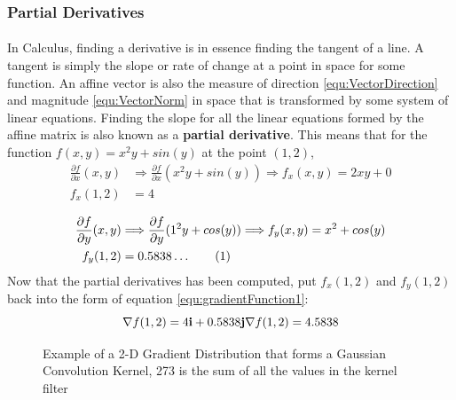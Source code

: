 \documentclass[11pt]{article}
\newcommand\numberthis{\addtocounter{equation}{1}\tag{\theequation}}%
\newcommand\simpleparagraph[1]{%
	\stepcounter{paragraph}\paragraph*{\theparagraph\quad{}#1}}
\renewcommand\theparagraph{}
\begin{document}
\subsubsection{Partial Derivatives}
\simpleparagraph{}
In Calculus, finding a derivative is in essence finding the tangent of a line. A tangent is simply the slope or rate of change at a point in space for some function. An affine vector is also the measure of direction \eqref{equ:VectorDirection} and magnitude \eqref{equ:VectorNorm} in space that is transformed by some system of linear equations. Finding the slope for all the linear equations formed by the affine matrix is also known as a \textbf{partial derivative}. This means that for the function $f(x,y)=x^{2}y+sin(y)$ at the point $(1,2)$,
{ \small
\begin{align*} 
	\frac{\partial f}{\partial x}(x,y) &\Longrightarrow \frac{\partial f}{\partial x}(x^{2}y+sin(y)) \Longrightarrow f_{x}(x,y) = 2xy+0\\
	f_{x}(1,2)&=4\\
	\end{align*} 
	\begin{align*} 
	\frac{\partial f}{\partial y}(x,y) &\Longrightarrow \frac{\partial f}{\partial y}(1^{2}y+cos(y)) \Longrightarrow f_{y}(x,y) = x^{2}+cos(y)\\
	f_{y}(1,2)&=0.5838\dots \numberthis \label{equ:SimplePartialDerivative} \\
\end{align*}
}
Now that the partial derivatives has been computed, put $f_{x}(1,2)$ and $f_{y}(1,2)$ back into the form of equation \ref{equ:gradientFunction1}:
\begin{equation}\label{equ:SimpleGradient}
	\nabla f(1,2)=4\textbf{i}+0.5838\textbf{j}\\
	\nabla f(1,2)=4.5838
\end{equation}

\begin{figure}[h]
	\centering
	\hfill
	\hfill
	\caption{Example of a 2-D Gradient Distribution that forms a Gaussian Convolution Kernel, 273 is the sum of all the values in the kernel filter}
	\label{fig:GaussianSmoothing}
\end{figure}
\end{document}
